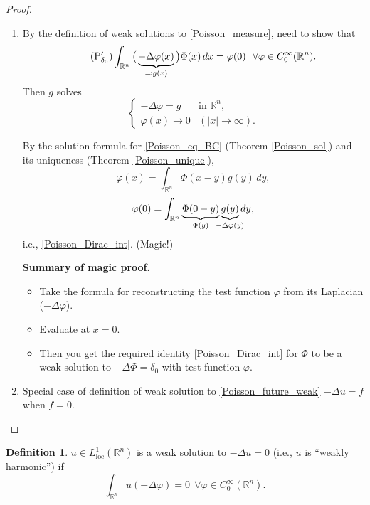 \documentclass[12pt]{article}
\theoremstyle{definition}
\newtheorem*{definition*}{Definition}
\begin{document}
\begin{proof}
\begin{enumerate}[label=\alph*)]
\item By the definition of weak solutions to \eqref{Poisson_measure}, need to show that
\begin{equation}\tag{P$_{\delta_0}'$}\label{Poisson_Dirac_int}
\int_{\mathbb{R}^n}\big(\underbrace{-\Delta\varphi(x)}_{\eqqcolon g(x)}\big)\Phi(x)\,dx=\varphi(0)\ \ \forall\varphi\in C_0^{\infty}(\mathbb{R}^n).
\end{equation}
Then $g$ solves
\begin{equation}\tag{P}\label{Poisson_eq_BC}
\left\{\begin{array}{ll}-\Delta\varphi=g&\text{in }\mathbb{R}^n,\\\varphi(x)\rightarrow0&(|x|\to\infty).\end{array}\right.
\end{equation}

By the solution formula for \eqref{Poisson_eq_BC} (Theorem \ref{Poisson_sol}) and its uniqueness (Theorem \ref{Poisson_unique}),
\[\varphi(x)=\int_{\mathbb{R}^n}\Phi(x-y)g(y)\,dy,\]
\[\varphi(0)=\int_{\mathbb{R}^n}\underbrace{\Phi(0-y)}_{\Phi(y)}\underbrace{g(y)}_{\mathclap{-\Delta\varphi(y)}}dy,\]
i.e., \eqref{Poisson_Dirac_int}. (Magic!)

\textbf{Summary of magic proof.}

\begin{itemize}
\item Take the formula for reconstructing the test function $\varphi$ from its Laplacian ($-\Delta\varphi$).

\item Evaluate at $x=0$.

\item Then you get the required identity \eqref{Poisson_Dirac_int} for $\Phi$ to be a weak solution to $-\Delta\Phi=\delta_0$ with test function $\varphi$.
\end{itemize}

\item Special case of definition of weak solution to \eqref{Poisson_future_weak} $-\Delta u=f$ when $f=0$.
\end{enumerate}
\end{proof}

\begin{definition*}
$u\in L_{\text{loc}}^1(\mathbb{R}^n)$ is a weak solution to $-\Delta u=0$ (i.e., $u$ is ``weakly harmonic'') if
\[\int_{\mathbb{R}^n}u(-\Delta\varphi)=0\ \ \forall\varphi\in C_0^{\infty}(\mathbb{R}^n).\]
\end{definition*}
\end{document}

